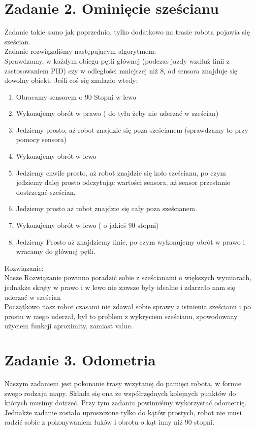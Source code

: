 \documentclass[paper=a4, fontsize=11pt]{scrartcl} %
\numberwithin{equation}{section} %
\numberwithin{figure}{section} %
\numberwithin{table}{section} %
\begin{document}
\section{Zadanie 2. Ominięcie sześcianu}
Zadanie takie samo jak poprzednio, tylko dodatkowo na trasie robota pojawia się sześcian.  
 \\
Zadanie rozwiązaliśmy następującym algorytmem:\\  
Sprawdzamy, w każdym obiegu pętli głównej (podczas jazdy wzdłuż linii z zastosowaniem PID) czy w odległości mniejszej niż 8, od sensora znajduje się dowolny obiekt. Jeśli coś się znalazło wtedy: 
\begin{enumerate}  
\item Obracamy sensorem o 90 Stopni w lewo  
\item Wykonujemy obrót w prawo ( do tyłu żeby nie uderzać w sześcian)  
\item Jedziemy prosto, aż robot znajdzie się poza sześcianem (sprawdzamy to przy pomocy sensora)  
\item Wykonujemy obrót w lewo  
\item Jedziemy chwile prosto, aż robot znajdzie się koło sześcianu, po czym jedziemy dalej prosto odczytując wartości sensora, aż sensor przestanie dostrzegać sześcian.  
\item Jedziemy prosto aż robot znajdzie się cały poza sześcianem.  
\item Wykonujemy obrót w lewo ( o jakieś 90 stopni)  
\item Jedziemy  Prosto aż znajdziemy linie, po czym wykonujemy obrót w prawo i wracamy do głównej pętli. 
\end{enumerate}
Rozwiązanie:  
\\
Nasze Rozwiązanie powinno poradzić sobie z sześcianami o większych wymiarach, jednakże skręty w prawo i w lewo nie zawsze były idealne i zdarzało nam się uderzać w sześcian 
\\
Początkowo  nasz robot czasami nie zdawał sobie sprawy z istnienia sześcianu i po prostu w niego uderzał,  był to problem z wykryciem sześcianu, spowodowany użyciem funkcji aproximity, zamiast value.  
\section{Zadanie 3. Odometria}
Naszym zadaniem jest pokonanie trasy wczytanej do pamięci robota, w formie swego rodzaju mapy. Składa się ona ze współrzędnych kolejnych punktów do których musimy dotrzeć. Przy tym zadaniu powinniśmy wykorzystać odometrię. Jednakże zadanie zostało uproszczone tylko do kątów prostych, robot nie musi radzić sobie z pokonywaniem łuków i obrotu o kąt inny niż 90 stopni. 
\end{document}
